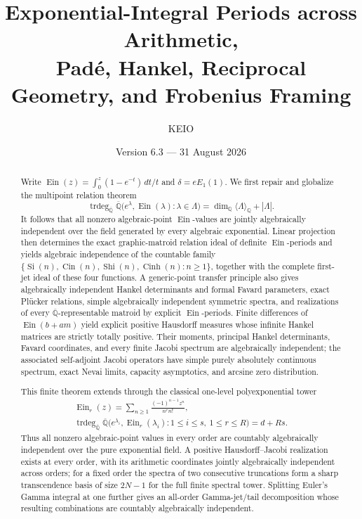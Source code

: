 \documentclass[11pt]{article}
\title{\bfseries Exponential-Integral Periods across Arithmetic,\\
Pad\'e, Hankel, Reciprocal Geometry, and Frobenius Framing}
\author{KEIO}
\date{Version 6.3 --- 31 August 2026}
\theoremstyle{definition}
\theoremstyle{remark}
\newcommand{\Q}{\mathbb Q}
\newcommand{\Qb}{\overline{\mathbb Q}}
\newcommand{\Qbar}{\overline{\mathbb Q}}
\newcommand{\trdeg}{\operatorname{trdeg}}
\newcommand{\Ein}{\operatorname{Ein}}
\newcommand{\EinDepth}[1]{\operatorname{Ein}_{#1}}
\newcommand{\Cin}{\operatorname{Cin}}
\newcommand{\Si}{\operatorname{Si}}
\newcommand{\Shi}{\operatorname{Shi}}
\newcommand{\Cinh}{\operatorname{Cinh}}
\begin{document}
\maketitle

\begin{abstract}
Write
\(\Ein(z)=\int_0^z(1-e^{-t})\,dt/t\) and
\(\delta=eE_1(1)\).  We first repair and globalize the multipoint relation
theorem
\[
 \trdeg_{\Qb}\Qb\bigl(e^\lambda,\Ein(\lambda):\lambda\in\Lambda\bigr)
 =\dim_\Q\langle\Lambda\rangle_\Q+|\Lambda|.
\]
It follows that all nonzero algebraic-point \(\Ein\)-values are jointly
algebraically independent over the field generated by every algebraic
exponential.  Linear projection then determines the exact graphic-matroid
relation ideal of definite \(\Ein\)-periods and yields algebraic
independence of the countable family
\(\{\Si(n),\Cin(n),\Shi(n),\Cinh(n):n\ge1\}\), together with the complete
first-jet ideal of these four functions.  A generic-point transfer principle
also gives algebraically independent Hankel determinants and formal Favard
parameters, exact Pl\"ucker relations, simple algebraically independent
symmetric spectra, and realizations of every \(\Qbar\)-representable matroid
by explicit \(\Ein\)-periods.  Finite differences of \(\Ein(b+am)\) yield
explicit positive Hausdorff measures whose infinite Hankel matrices are
strictly totally positive.  Their moments, principal Hankel determinants,
Favard coordinates, and every finite Jacobi spectrum are algebraically
independent; the associated self-adjoint Jacobi operators have simple purely
absolutely continuous spectrum, exact Nevai limits, capacity asymptotics,
and arcsine zero distribution.

This finite theorem extends through the classical one-level
polyexponential tower
\[
\begin{gathered}
 \EinDepth{r}(z)=\sum_{n\geq1}\frac{(-1)^{n-1}z^n}{n^r n!},\\
 \trdeg_{\Qbar}\Qbar\bigl(e^{\lambda_i},
 \EinDepth{r}(\lambda_i):
 1\leq i\leq s,\ 1\leq r\leq R\bigr)=d+Rs.
\end{gathered}
\]
Thus all nonzero algebraic-point values in every order are countably
algebraically independent over the pure exponential field.  A positive
Hausdorff--Jacobi realization exists at every order, with its arithmetic
coordinates jointly algebraically independent across orders; for a fixed
order the spectra of two consecutive truncations form a sharp
transcendence basis of size \(2N-1\) for the full finite spectral tower.
Splitting Euler's Gamma integral at one further gives an all-order
Gamma-jet/tail decomposition whose resulting combinations are countably
algebraically independent.


\end{abstract}
\end{document}
